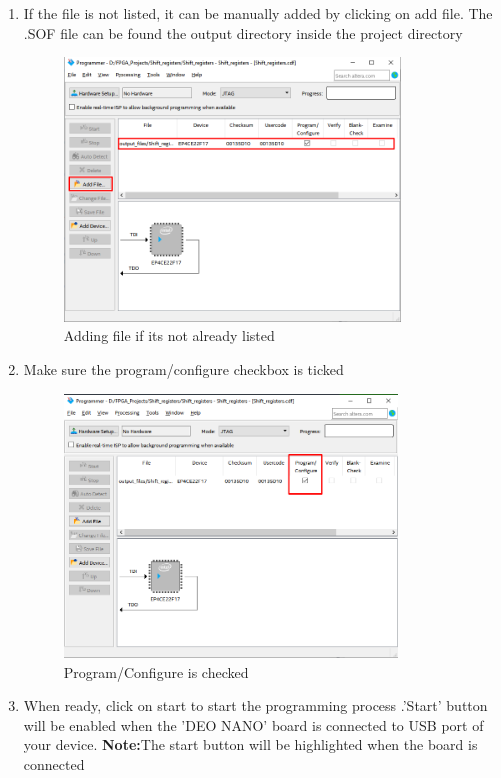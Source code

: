 \documentclass[12pt]{article}
\begin{document}
\begin{enumerate}
\begin{figure}[H]
     \end{figure}
     \item If the file is not listed, it can be manually added by clicking on add file. The .SOF file can be found the output directory inside the project directory 
     \begin{figure}[H]
         \centering
         \includegraphics[height=7cm,keepaspectratio]{downloading to board/4.png}
         \caption{Adding file if its not already listed}
     \end{figure}
     \item Make sure the program/configure checkbox is ticked
     \begin{figure}[H]
         \centering
         \includegraphics[height=7cm,keepaspectratio]{downloading to board/5.png}
         \caption{Program/Configure is checked}
     \end{figure}
     \item When ready, click on start to start the programming process .'Start' button will be enabled when the 'DEO NANO' board is connected to USB port of your device.
     \textbf{Note:}The start button will be highlighted when the board is connected
     \begin{figure}[H]

\end{figure}
\end{enumerate}
\end{document}

